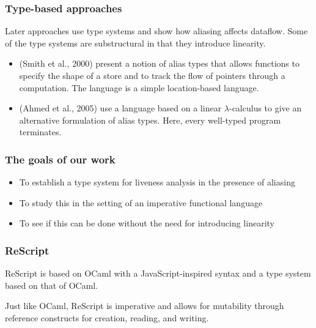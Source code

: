\documentclass{beamer}
\begin{document}
\begin{frame}
  \frametitle{Type-based approaches}

  Later approaches use type systems and show how aliasing affects
  dataflow. Some of the type systems are substructural in that they
  introduce linearity.
  
  \begin{itemize}
  \item (Smith et al., 2000) present a notion of alias types that allows
    functions to specify the shape of a store and to track the flow of
    pointers through a computation. The language is a simple
    location-based language.
  \item (Ahmed et al., 2005) use a language based on a linear
    $\lambda$-calculus to give an alternative formulation of alias
    types. Here, every well-typed program terminates.
  \end{itemize}
\end{frame}

\begin{frame}
  \frametitle{The goals of our work}

  \begin{itemize}
  \item To establish a type system for liveness analysis in the
    presence of aliasing
  \item To study this in the setting of an imperative functional
    language
  \item To see if this can be done without the need for introducing linearity
  \end{itemize}
\end{frame}

\begin{frame}
  \frametitle{ReScript}

  ReScript is based on OCaml with a JavaScript-inspired syntax and a
  type system based on that of OCaml. 


  Just like OCaml, ReScript is imperative and allows for mutability
  through reference constructs for creation, reading, and writing.
  
\end{frame}


\end{document}
